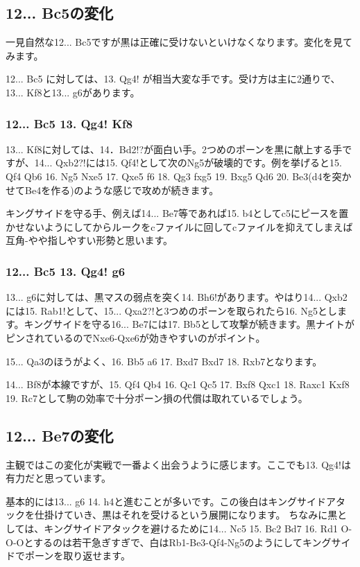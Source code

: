 \subsection{12... Bc5の変化}
一見自然な12... Bc5ですが黒は正確に受けないといけなくなります。変化を見てみます。

12... Bc5 に対しては、13. Qg4! が相当大変な手です。受け方は主に2通りで、13... Kf8と13... g6があります。

\subsubsection{12... Bc5 13. Qg4! Kf8}
13... Kf8に対しては、14．Bd2!?が面白い手。2つめのポーンを黒に献上する手ですが、14... Qxb2?!には15. Qf4!として次のNg5が破壊的です。例を挙げると15. Qf4 Qb6 16. Ng5 Nxe5 17. Qxe5 f6 18. Qg3 fxg5 19. Bxg5 Qd6 20. Be3(d4を突かせてBe4を作る)のような感じで攻めが続きます。

キングサイドを守る手、例えば14... Be7等であれば15. b4としてc5にピースを置かせないようにしてからルークをcファイルに回してcファイルを抑えてしまえば互角-やや指しやすい形勢と思います。

\subsubsection{12... Bc5 13. Qg4! g6}
13... g6に対しては、黒マスの弱点を突く14. Bh6!があります。やはり14... Qxb2には15. Rab1!として、15... Qxa2?!と3つめのポーンを取られたら16. Ng5とします。キングサイドを守る16... Be7には17. Bb5として攻撃が続きます。黒ナイトがピンされているのでNxe6-Qxe6が効きやすいのがポイント。

15... Qa3のほうがよく、16. Bb5 a6 17. Bxd7 Bxd7 18. Rxb7となります。

14... Bf8が本線ですが、15. Qf4 Qb4 16. Qc1 Qc5 17. Bxf8 Qxc1 18. Raxc1 Kxf8 19. Rc7として駒の効率で十分ポーン損の代償は取れているでしょう。

\subsection{12... Be7の変化}
主観ではこの変化が実戦で一番よく出会うように感じます。ここでも13. Qg4!は有力だと思っています。

基本的には13... g6 14. h4と進むことが多いです。この後白はキングサイドアタックを仕掛けていき、黒はそれを受けるという展開になります。
ちなみに黒としては、キングサイドアタックを避けるために14... Nc5 15. Bc2 Bd7 16. Rd1 O-O-Oとするのは若干急ぎすぎで、白はRb1-Be3-Qf4-Ng5のようにしてキングサイドでポーンを取り返せます。

